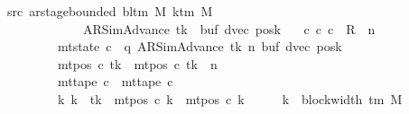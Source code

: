 \begin{isabellebody}
\ \ \ \ \ \ \ src{}{\isacharcolon}{\kern0pt}\ {\isachardoublequoteopen}ar{\isacharunderscore}{\kern0pt}stage{\isacharunderscore}{\kern0pt}bounded\ {\isacharparenleft}{\kern0pt}bl{\isacharunderscore}{\kern0pt}tm\ M{\isacharparenright}{\kern0pt}\ {\isacharparenleft}{\kern0pt}k{\isacharunderscore}{\kern0pt}tm\ M{\isacharparenright}{\kern0pt}\isanewline
\ \ \ \ \ \ \ \ \ \ \ \ \ \ \ \ \ \ \ {\isacharparenleft}{\kern0pt}AR{\isacharunderscore}{\kern0pt}SimAdvance{\isacharcomma}{\kern0pt}\ tk{\isacharcomma}{\kern0pt}\ {}{\isacharcomma}{\kern0pt}\ buf{\isacharcomma}{\kern0pt}\ dvec{\isacharcomma}{\kern0pt}\ posk{\isacharparenright}{\kern0pt}{\isachardoublequoteclose}\isanewline
\ \ \ {\isachardoublequoteopen}{\isasymexists}c{\isacharprime}{\kern0pt}{\isachardot}{\kern0pt}\ {\isacharparenleft}{\kern0pt}c{}{\isacharcomma}{\kern0pt}\ c{\isacharprime}{\kern0pt}{\isacharparenright}{\kern0pt}\ {\isasymin}\ R{\isacharprime}{\kern0pt}\ {\isacharcircum}{\kern0pt}{\isacharcircum}{\kern0pt}\ n\isanewline
\ \ \ \ \ \ \ \ \ \ \ \ \ \ {\isasymand}\ mt{\isacharunderscore}{\kern0pt}state\ c{\isacharprime}{\kern0pt}\ {\isacharequal}{\kern0pt}\ {\isacharparenleft}{\kern0pt}q{\isacharcomma}{\kern0pt}\ AR{\isacharunderscore}{\kern0pt}SimAdvance{\isacharcomma}{\kern0pt}\ tk{\isacharcomma}{\kern0pt}\ n{\isacharcomma}{\kern0pt}\ buf{\isacharcomma}{\kern0pt}\ dvec{\isacharcomma}{\kern0pt}\ posk{\isacharparenright}{\kern0pt}\isanewline
\ \ \ \ \ \ \ \ \ \ \ \ \ \ {\isasymand}\ mt{\isacharunderscore}{\kern0pt}pos\ c{\isacharprime}{\kern0pt}\ tk\ {\isacharequal}{\kern0pt}\ mt{\isacharunderscore}{\kern0pt}pos\ c{}\ tk\ {\isacharminus}{\kern0pt}\ n\isanewline
\ \ \ \ \ \ \ \ \ \ \ \ \ \ {\isasymand}\ mt{\isacharunderscore}{\kern0pt}tape\ c{\isacharprime}{\kern0pt}\ {\isacharequal}{\kern0pt}\ mt{\isacharunderscore}{\kern0pt}tape\ c{}\isanewline
\ \ \ \ \ \ \ \ \ \ \ \ \ \ {\isasymand}\ {\isacharparenleft}{\kern0pt}{\isasymforall}k{\isacharprime}{\kern0pt}{\isachardot}{\kern0pt}\ k{\isacharprime}{\kern0pt}\ {\isasymnoteq}\ tk\ {\isasymlongrightarrow}\ mt{\isacharunderscore}{\kern0pt}pos\ c{\isacharprime}{\kern0pt}\ k{\isacharprime}{\kern0pt}\ {\isacharequal}{\kern0pt}\ mt{\isacharunderscore}{\kern0pt}pos\ c{}\ k{\isacharprime}{\kern0pt}{\isacharparenright}{\kern0pt}{\isachardoublequoteclose}\isanewline
%
\isadelimproof
%
\endisadelimproof
%
\isatagproof
{}\isamarkupfalse%
\ {\isacharminus}{\kern0pt}\isanewline
\ \ \isamarkupfalse%
\ {\isacharquery}{\kern0pt}k\ {\isacharequal}{\kern0pt}\ {\isachardoublequoteopen}block{\isacharunderscore}{\kern0pt}width\ {\isacharparenleft}{\kern0pt}{\isasymGamma}{\isacharunderscore}{\kern0pt}tm\ M{\isacharparenright}{\kern0pt}{\isachardoublequoteclose}\isanewline

\end{isabellebody}
